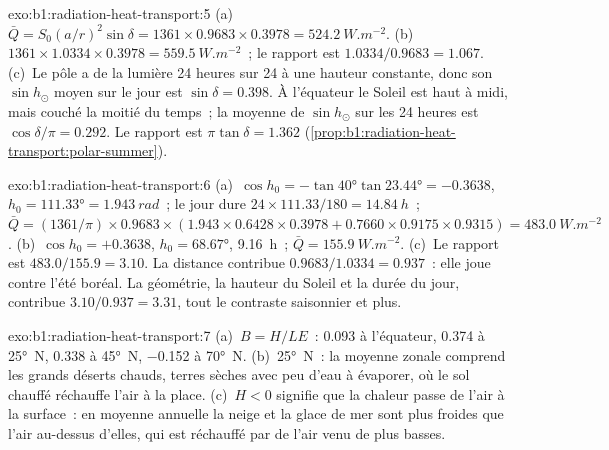 \begin{solution}{exo:b1:radiation-heat-transport:5}
(a)~$\bar Q = S_0(a/r)^2\sin\delta = 1361 \times 0.9683 \times 0.3978 =
\qty{524.2}{W.m^{-2}}$. (b)~$1361 \times 1.0334 \times 0.3978 =
\qty{559.5}{W.m^{-2}}$~; le rapport est $1.0334/0.9683 = 1.067$. (c)~Le pôle a
de la lumière 24 heures sur 24 à une hauteur constante, donc son $\sin h_\odot$ moyen sur
le jour est $\sin\delta = 0.398$. À l'équateur le Soleil est haut à midi, mais couché
la moitié du temps~; la moyenne de $\sin h_\odot$ sur les 24 heures est $\cos\delta/\pi =
0.292$. Le rapport est $\pi\tan\delta = 1.362$
(\cref{prop:b1:radiation-heat-transport:polar-summer}).
\end{solution}

\begin{solution}{exo:b1:radiation-heat-transport:6}
(a)~$\cos h_0 = -\tan\ang{40}\tan\ang{23.44} = -0.3638$, $h_0 = \ang{111.33} =
\qty{1.943}{rad}$~; le jour dure $24 \times 111.33/180 = \qty{14.84}{h}$~; $\bar Q =
(1361/\pi) \times 0.9683 \times (1.943 \times 0.6428 \times 0.3978 + 0.7660 \times
0.9175 \times 0.9315) = \qty{483.0}{W.m^{-2}}$. (b)~$\cos h_0 = +0.3638$, $h_0 =
\ang{68.67}$, \qty{9.16}{h}~; $\bar Q = \qty{155.9}{W.m^{-2}}$. (c)~Le rapport est
$483.0/155.9 = 3.10$. La distance contribue $0.9683/1.0334 = 0.937$~: elle joue
contre l'été boréal. La géométrie, la hauteur du Soleil et la durée
du jour, contribue $3.10/0.937 = 3.31$, tout le contraste saisonnier et plus.
\end{solution}

\begin{solution}{exo:b1:radiation-heat-transport:7}
(a)~$B = H/LE$~: \num{0.093} à l'équateur, \num{0.374} à \ang{25}~N,
\num{0.338} à \ang{45}~N, \num{-0.152} à \ang{70}~N. (b)~\ang{25}~N~: la moyenne
zonale comprend les grands déserts chauds, terres sèches avec peu d'eau à évaporer, où
le sol chauffé réchauffe l'air à la place. (c)~$H < 0$ signifie que la chaleur passe de
l'air à la surface~: en moyenne annuelle la neige et la glace de mer sont plus froides que l'air
au-dessus d'elles, qui est réchauffé par de l'air venu de  plus basses.
\end{solution}

